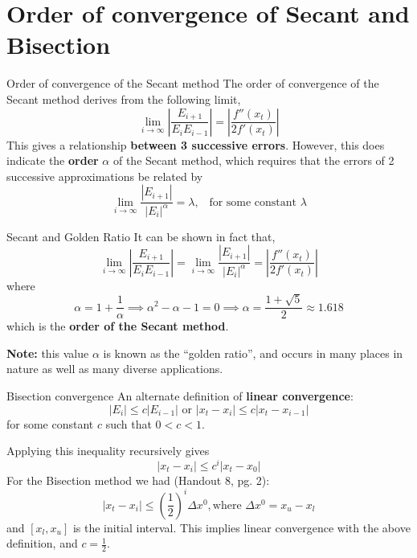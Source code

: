 \documentclass[12pt]{beamer}
\begin{document}
\section{Order of convergence of Secant and Bisection} 

\begin{frame}{Order of convergence of the Secant method}
The order of convergence of the Secant method derives from the following limit, 
\begin{equation} 
\lim_{i \rightarrow \infty} \left| \frac{E_{i+1}}{E_iE_{i-1}}\right| = \left| \frac{f''(x_t)}{2f'(x_t)} \right|
\end{equation} 
\noindent 
This gives a relationship {\bf between 3 successive errors}. 
However, this does indicate the {\bf order} $\alpha$ of the Secant method, which requires that the errors of 2 successive approximations be related by 
\begin{equation} 
\lim_{i \rightarrow \infty} \frac{|E_{i+1}|}{|E_i|^{\alpha}} = \lambda, \;\;\; \mbox{for some constant } \lambda 
\end{equation} 
\end{frame} 

\begin{frame}{Secant and Golden Ratio} 
It can be shown in fact that, 
\begin{equation} 
\lim_{i \rightarrow \infty} \left| \frac{E_{i+1}}{E_iE_{i-1}}\right| = \lim_{i \rightarrow \infty} \frac{|E_{i+1}|}{|E_i|^{\alpha}} = \left| \frac{f''(x_t)}{2f'(x_t)} \right|
\end{equation}
where 
\[
\alpha = 1 + \frac{1}{\alpha} \implies \alpha^2 - \alpha -1 = 0 \implies \alpha = \frac{1+\sqrt{5}}{2} \approx 1.618 
\]
\noindent 
which is the {\bf order of the Secant method}. 

\noindent 
{\bf Note:} this value $\alpha$ is known as the ``golden ratio'', and occurs in many places in nature as well as many diverse applications. 
\end{frame} 


\begin{frame}{Bisection convergence} 
An alternate definition of {\bf linear convergence}: 
\[
|E_i| \leq c|E_{i-1}| \mbox{ or } |x_t - x_i| \leq c |x_t - x_{i-1}|
\]
\noindent 
for some constant $c$ such that $0 < c < 1$. 

Applying this inequality recursively gives 
\[
|x_t - x_i| \leq c^{i} |x_t-x_0|
\]
\noindent 
For the Bisection method we had (Handout 8, pg. 2): 
\[
|x_t - x_i| \leq \left( \frac{1}{2}\right)^i \Delta x^0,\mbox{where } \Delta x^{0} = x_u - x_l 
\]
\noindent 
and $[x_l, x_u]$ is the initial interval. This implies linear convergence with the above definition, and $c=\frac{1}{2}$. 
\end{frame} 
\end{document}
